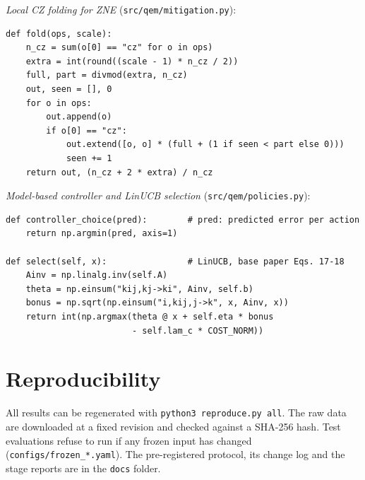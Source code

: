 \documentclass[conference]{IEEEtran}
\begin{document}
\textit{Local CZ folding for ZNE} (\texttt{src/qem/mitigation.py}):
\begin{lstlisting}
def fold(ops, scale):
    n_cz = sum(o[0] == "cz" for o in ops)
    extra = int(round((scale - 1) * n_cz / 2))
    full, part = divmod(extra, n_cz)
    out, seen = [], 0
    for o in ops:
        out.append(o)
        if o[0] == "cz":
            out.extend([o, o] * (full + (1 if seen < part else 0)))
            seen += 1
    return out, (n_cz + 2 * extra) / n_cz
\end{lstlisting}

\textit{Model-based controller and LinUCB selection} (\texttt{src/qem/policies.py}):
\begin{lstlisting}
def controller_choice(pred):        # pred: predicted error per action
    return np.argmin(pred, axis=1)

def select(self, x):                # LinUCB, base paper Eqs. 17-18
    Ainv = np.linalg.inv(self.A)
    theta = np.einsum("kij,kj->ki", Ainv, self.b)
    bonus = np.sqrt(np.einsum("i,kij,j->k", x, Ainv, x))
    return int(np.argmax(theta @ x + self.eta * bonus
                         - self.lam_c * COST_NORM))
\end{lstlisting}

\section{Reproducibility}
All results can be regenerated with \texttt{python3 reproduce.py all}. The raw data are downloaded at a fixed revision and checked against a SHA-256 hash. Test evaluations refuse to run if any frozen input has changed (\texttt{configs/frozen\_*.yaml}). The pre-registered protocol, its change log and the stage reports are in the \texttt{docs} folder.
\end{document}
